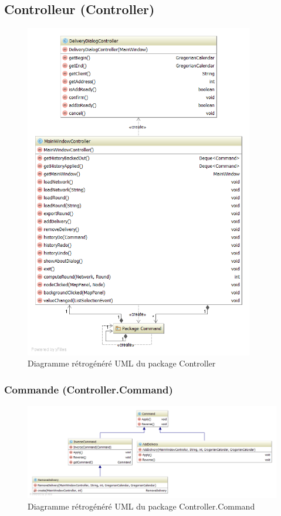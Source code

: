 \subsection{Controlleur (Controller)}

\begin{figure}[h]
    \centering
    \includegraphics[width=100mm]{../diagrams/classes_packages/final_classes_packages/controller/controller.png}
    \caption{Diagramme r\'etrog\'en\'er\'e UML du package Controller}
    \label{diagram:gen_uml_controller}
\end{figure}
\pagebreak

\begin{landscape}
\subsubsection{Commande (Controller.Command)}

\begin{figure}[h]
    \centering
    \includegraphics[width=240mm]{../diagrams/classes_packages/final_classes_packages/controller/package_command.png}
    \caption{Diagramme r\'etrog\'en\'er\'e UML du package Controller.Command}
    \label{diagram:gen_uml_controller_command}
\end{figure}
\end{landscape}

